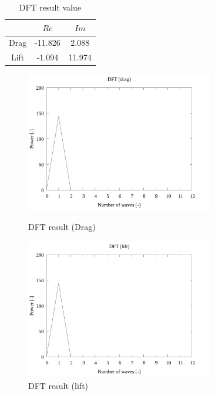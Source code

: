 \documentclass[twocolumn,a4j]{jsarticle}
\begin{document}
\begin{table}[htbp]
    \begin{center}
        \caption{DFT result value}
        \begin{tabular}{|p{30mm}|p{20mm}|p{20mm}|}
            \hline
            \multicolumn{1}{|c|}{}     & \multicolumn{1}{|c|}{$Re$}    & \multicolumn{1}{|c|}{$Im$}   \\ \hline
            \multicolumn{1}{|c|}{Drag} & \multicolumn{1}{|c|}{-11.826} & \multicolumn{1}{|c|}{2.088}  \\ \hline
            \multicolumn{1}{|c|}{Lift} & \multicolumn{1}{|c|}{-1.094}  & \multicolumn{1}{|c|}{11.974} \\ \hline
        \end{tabular}
    \end{center}
\end{table}

\newpage
\begin{figure}[htbp]
    \begin{center}
        \includegraphics[width=82mm]{../../../02_workspace/result/simulation_tx=10.0_ty=-5.0_dx=5.00_dy=-2.50/plot/07/07-3_dft-drag.png}
        \caption{DFT result (Drag)}
        \includegraphics[width=82mm]{../../../02_workspace/result/simulation_tx=10.0_ty=-5.0_dx=5.00_dy=-2.50/plot/07/07-4_dft-lift.png}
        \caption{DFT result (lift)}
    \end{center}
\end{figure}
\end{document}
